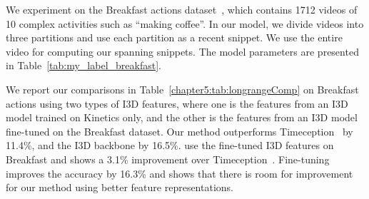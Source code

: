 \documentclass[10pt,twocolumn,letterpaper]{article}
\begin{document}
\begin{table}[t]
\centering
{}
\vspace{1pt}
\caption{
Comparisons to methods developed for recognizing long-range complex activities, Timeception~\cite{hussein2019timeception} and PIC~\cite{hussein2020pic} on the Breakfast Actions dataset.
Our method outperforms Timeception~\cite{hussein2019timeception} by a significant margin showing the superiority of our method in modelling long-range activities.
}
\label{chapter5:tab:longrangeComp}
\end{table}


We experiment on the Breakfast actions dataset~\cite{kuehne2014language}, which contains 1712 videos of 10 complex activities such as ``making coffee''. 
In our model, we divide videos into three partitions and use each partition as a recent snippet. 
We use the entire video for computing our spanning snippets. 
The model parameters are presented in Table~\ref{tab:my_label_breakfast}.


We report our comparisons in Table~\ref{chapter5:tab:longrangeComp} on Breakfast actions using two types of I3D features, where one is the features from an I3D model trained on Kinetics only, and the other is the features from an I3D model fine-tuned on the Breakfast dataset.
Our method outperforms Timeception~\cite{hussein2019timeception} by 11.4\%, and the I3D backbone by 16.5\%.
\cite{hussein2020pic} use the fine-tuned I3D features on Breakfast and shows a 3.1\% improvement over Timeception~\cite{hussein2019timeception}.
Fine-tuning improves the accuracy by 16.3\% and shows that there is room for improvement for our method using better feature representations.
\end{document}

